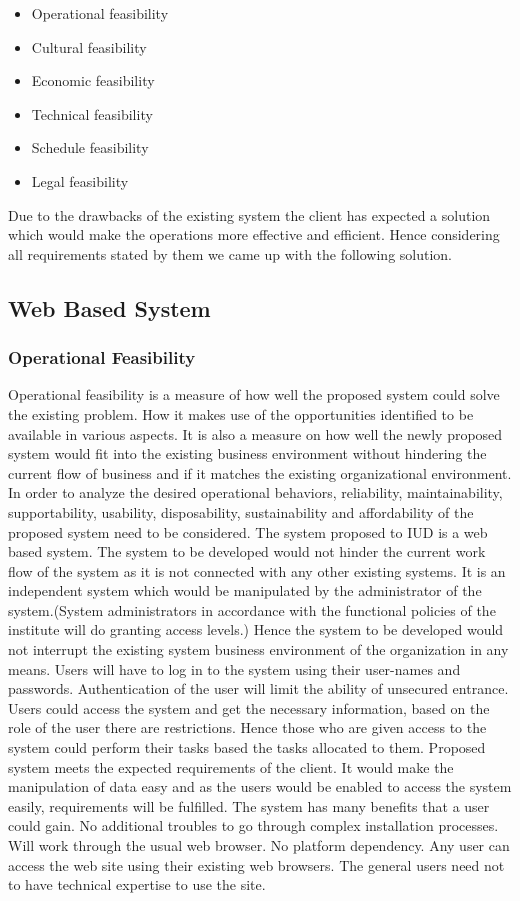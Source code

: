 \documentclass[a4paper,beamer]{article}
\begin{document}
	\begin{itemize}
		\item Operational feasibility
		\item Cultural feasibility
		\item Economic feasibility
		\item Technical feasibility
		\item Schedule feasibility
		\item Legal feasibility
	\end{itemize}
	
	Due to the drawbacks of the existing system the client has expected a solution which would make the operations more effective and efficient. Hence considering all requirements stated by them we came up with the following solution.
	
	\subsection{Web Based System}
	\subsubsection{Operational Feasibility}
	Operational feasibility is a measure of how well the proposed system could solve the existing problem. How it makes use of the opportunities identified to be available in various aspects.
	It is also a measure on how well the newly proposed system would fit into the existing business environment without hindering the current flow of business and if it matches the existing organizational environment.
	In order to analyze the desired operational behaviors, reliability, maintainability, supportability, usability, disposability, sustainability and affordability of the proposed system need to be considered.
	The system proposed to IUD is a web based system. The system to be developed would not hinder the current work flow of the system as it is not connected with any other existing systems. It is an independent system which would be manipulated by the administrator of the system.(System administrators in accordance with the functional policies of the institute will do granting access levels.) Hence the system to be developed would not interrupt the existing system business environment of the organization in any means.
	Users will have to log in to the system using their user-names and passwords. Authentication of the user will limit the ability of unsecured entrance.
	Users could access the system and get the necessary information, based on the role of the user there are restrictions. Hence those who are given access to the system could perform their tasks based the tasks allocated to them.
	Proposed system meets the expected requirements of the client. It would make the manipulation of data easy and as the users would be enabled to access the system easily, requirements will be fulfilled.
	The system has many benefits that a user could gain.
	No additional troubles to go through complex installation processes. Will work through the usual web browser.
	No platform dependency. Any user can access the web site using their existing web browsers. The general users need not to have technical expertise to use the site.
	
\end{document}
